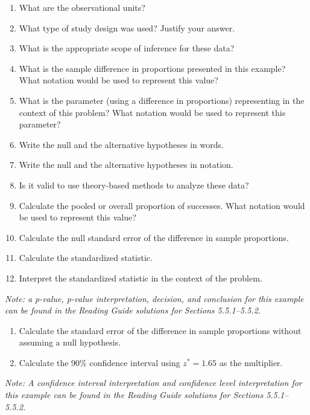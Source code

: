 \documentclass[
]{report}
\newcommand{\rgs}{\vspace{12pt}} %
\begin{document}
\begin{enumerate}
\def\labelenumi{\arabic{enumi}.}
\item
  What are the observational units?
  \rgs
\item
  What type of study design was used? Justify your answer.
  \rgs
\item
  What is the appropriate scope of inference for these data?
  \rgs
\item
  What is the sample difference in proportions presented in this example? What notation would be used to represent this value?
  \rgs
\item
  What is the parameter (using a difference in proportions) representing in the context of this problem? What notation would be used to represent this parameter?
  \rgs
\item
  Write the null and the alternative hypotheses in words.
  \rgs
  \rgs
\item
  Write the null and the alternative hypotheses in notation.
  \rgs
\item
  Is it valid to use theory-based methods to analyze these data?
  \rgs
  \rgs
\item
  Calculate the pooled or overall proportion of successes. What notation would be used to represent this value?
  \rgs
  \rgs
\item
  Calculate the null standard error of the difference in sample proportions.
  \rgs
  \rgs
\item
  Calculate the standardized statistic.
  \rgs
  \rgs
\item
  Interpret the standardized statistic in the context of the problem.
  \rgs
  \rgs
\end{enumerate}

\emph{Note: a p-value, p-value interpretation, decision, and conclusion for this example can be found in the Reading Guide solutions for Sections 5.5.1--5.5.2.}

\begin{enumerate}
\def\labelenumi{\arabic{enumi}.}
\setcounter{enumi}{12}
\item
  Calculate the standard error of the difference in sample proportions without assuming a null hypothesis.
  \rgs
  \rgs
\item
  Calculate the 90\% confidence interval using \(z^*=1.65\) as the multiplier.
  \rgs
  \rgs
\end{enumerate}

\emph{Note: A confidence interval interpretation and confidence level interpretation for this example can be found in the Reading Guide solutions for Sections 5.5.1--5.5.2.}
\end{document}
